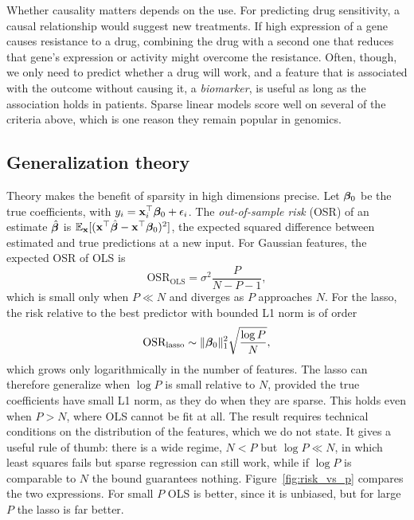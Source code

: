 Whether causality matters depends on the use. For predicting drug sensitivity, a causal relationship would suggest new treatments. If high expression of a gene causes resistance to a drug, combining the drug with a second one that reduces that gene's expression or activity might overcome the resistance. Often, though, we only need to predict whether a drug will work, and a feature that is associated with the outcome without causing it, a \emph{biomarker}, is useful as long as the association holds in patients. Sparse linear models score well on several of the criteria above, which is one reason they remain popular in genomics.

\subsection{Generalization theory}
\label{sec:gen_theory}

Theory makes the benefit of sparsity in high dimensions precise. Let $\boldsymbol{\beta}_0$ be the true coefficients, with $y_i=\mathbf{x}_i^\top\boldsymbol{\beta}_0+\epsilon_i$. The \emph{out-of-sample risk} (OSR) of an estimate $\hat{\boldsymbol{\beta}}$ is $\mathbb{E}_{\mathbf{x}}[(\mathbf{x}^\top\hat{\boldsymbol{\beta}}-\mathbf{x}^\top\boldsymbol{\beta}_0)^2]$, the expected squared difference between estimated and true predictions at a new input. For Gaussian features, the expected OSR of OLS is
\begin{equation}
  \text{OSR}_{\text{OLS}} = \sigma^2\frac{P}{N-P-1},
\end{equation}
which is small only when $P\ll N$ and diverges as $P$ approaches $N$. For the lasso, the risk relative to the best predictor with bounded L1 norm is of order~\citep{greenshtein2004}
\begin{equation}
  \text{OSR}_{\text{lasso}} \sim \|\boldsymbol{\beta}_0\|_1^2\sqrt{\frac{\log P}{N}},
\end{equation}
which grows only logarithmically in the number of features. The lasso can therefore generalize when $\log P$ is small relative to $N$, provided the true coefficients have small L1 norm, as they do when they are sparse. This holds even when $P>N$, where OLS cannot be fit at all. The result requires technical conditions on the distribution of the features, which we do not state. It gives a useful rule of thumb: there is a wide regime, $N<P$ but $\log P\ll N$, in which least squares fails but sparse regression can still work, while if $\log P$ is comparable to $N$ the bound guarantees nothing. Figure~\ref{fig:risk_vs_p} compares the two expressions. For small $P$ OLS is better, since it is unbiased, but for large $P$ the lasso is far better.

